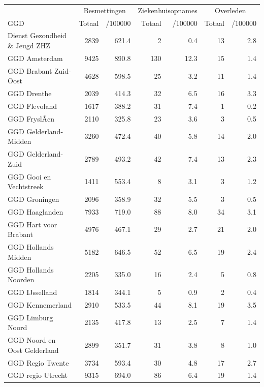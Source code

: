 \documentclass[
  english,
  man,floatsintext]{apa6}
\begin{document}
\begin{table}[H]
\centering\begingroup\fontsize{10}{12}\selectfont

\begin{threeparttable}
\begin{tabular}{lrrrrrr}
\toprule
\multicolumn{1}{c}{ } & \multicolumn{2}{c}{Besmettingen} & \multicolumn{2}{c}{Ziekenhuisopnames} & \multicolumn{2}{c}{Overleden} \\
\cmidrule(l{3pt}r{3pt}){2-3} \cmidrule(l{3pt}r{3pt}){4-5} \cmidrule(l{3pt}r{3pt}){6-7}
GGD & Totaal & /100000 & Totaal & /100000 & Totaal & /100000\\
\midrule
Dienst Gezondheid \& Jeugd ZHZ & 2839 & 621.4 & 2 & 0.4 & 13 & 2.8\\
GGD Amsterdam & 9425 & 890.8 & 130 & 12.3 & 15 & 1.4\\
GGD Brabant Zuid-Oost & 4628 & 598.5 & 25 & 3.2 & 11 & 1.4\\
GGD Drenthe & 2039 & 414.3 & 32 & 6.5 & 16 & 3.3\\
GGD Flevoland & 1617 & 388.2 & 31 & 7.4 & 1 & 0.2\\
GGD FryslÃ¢n & 2110 & 325.8 & 23 & 3.6 & 3 & 0.5\\
GGD Gelderland-Midden & 3260 & 472.4 & 40 & 5.8 & 14 & 2.0\\
GGD Gelderland-Zuid & 2789 & 493.2 & 42 & 7.4 & 13 & 2.3\\
GGD Gooi en Vechtstreek & 1411 & 553.4 & 8 & 3.1 & 3 & 1.2\\
GGD Groningen & 2096 & 358.9 & 32 & 5.5 & 3 & 0.5\\
GGD Haaglanden & 7933 & 719.0 & 88 & 8.0 & 34 & 3.1\\
GGD Hart voor Brabant & 4976 & 467.1 & 29 & 2.7 & 21 & 2.0\\
GGD Hollands Midden & 5182 & 646.5 & 52 & 6.5 & 19 & 2.4\\
GGD Hollands Noorden & 2205 & 335.0 & 16 & 2.4 & 5 & 0.8\\
GGD IJsselland & 1814 & 344.1 & 5 & 0.9 & 2 & 0.4\\
GGD Kennemerland & 2910 & 533.5 & 44 & 8.1 & 19 & 3.5\\
GGD Limburg Noord & 2135 & 417.8 & 13 & 2.5 & 7 & 1.4\\
GGD Noord en Oost Gelderland & 2899 & 351.7 & 31 & 3.8 & 8 & 1.0\\
GGD Regio Twente & 3734 & 593.4 & 30 & 4.8 & 17 & 2.7\\
GGD regio Utrecht & 9315 & 694.0 & 86 & 6.4 & 19 & 1.4\\

\end{tabular}
\end{threeparttable}
\end{table}
\end{document}
